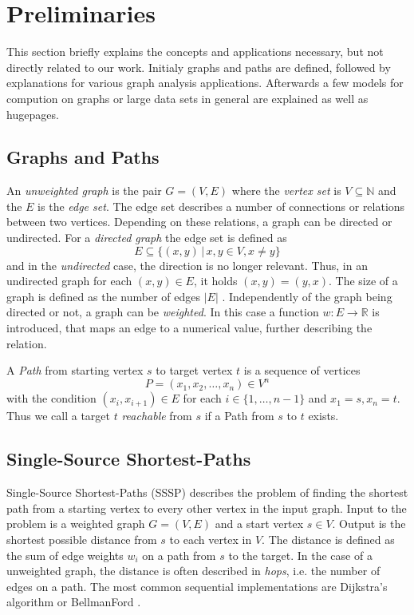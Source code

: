 
\section{Preliminaries}
This section briefly explains the concepts and applications necessary, but not directly related to our work.
Initialy graphs and paths are defined, followed by explanations for various graph analysis applications.
Afterwards a few models for compution on graphs or large data sets in general are explained as well as hugepages.

\subsection{Graphs and Paths}
An \emph{unweighted graph} is the pair $G=(V,E)$ where the \emph{vertex set} is $V\subseteq\mathbb N$ and the $E$ is the \emph{edge set}.
The edge set describes a number of connections or relations between two vertices. Depending on these relations, a graph can be directed or undirected. For a \emph{directed graph} the edge set is defined as
\begin{equation*}
  E\subseteq\{(x,y)\,|\, x,y\in V, x\neq y\}
\end{equation*}
and in the \emph{undirected} case, the direction is no longer relevant. Thus, in an undirected graph for each $(x,y)\in E$, it holds $(x,y)=(y,x)$.
The size of a graph is defined as the number of edges $|E|$ \cite{newman2010networks}.
Independently of the graph being directed or not, a graph can be \emph{weighted}. In this case a function $w:E\rightarrow \mathbb R$ is introduced, that maps an edge to a numerical value, further describing the relation.

A \emph{Path} from starting vertex $s$ to target vertex $t$ is a sequence of vertices
\begin{equation*}
	P=(x_1,x_2,\ldots,x_n)\in V^n
\end{equation*}
with the condition $(x_i,x_{i+1})\in E$ for each $i\in\{1,\ldots,n-1\}$ and $x_1=s, x_n=t$.
Thus we call a target $t$ \emph{reachable} from $s$ if a Path from $s$ to $t$ exists.

\subsection{Single-Source Shortest-Paths}
Single-Source Shortest-Paths (SSSP) describes the problem of finding the shortest path from a starting vertex to every other vertex in the input graph.
Input to the problem is a weighted graph $G=(V,E)$ and a start vertex $s\in V$. Output is the shortest possible distance from $s$ to each vertex in $V$.
The distance is defined as the sum of edge weights $w_i$ on a path from $s$ to the target.
In the case of a unweighted graph, the distance is often described in \emph{hops}, i.e. the number of edges on a path.
The most common sequential implementations are Dijkstra's algorithm or BellmanFord \cite{Polymer, Ligra, pregel}.

